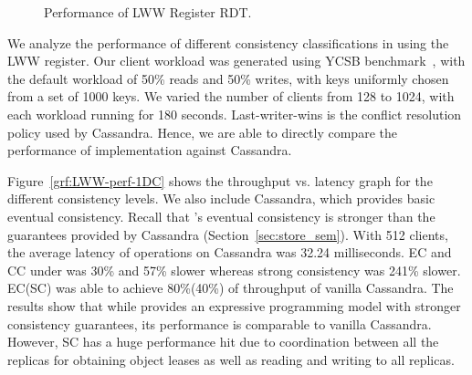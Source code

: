 \begin{figure}
  \centering
	\caption{Performance of LWW Register RDT.}
  \label{grf:LWW_perf}
\end{figure}

We analyze the performance of different consistency classifications in \name
using the LWW register. Our client workload was generated using YCSB
benchmark~\cite{}, with the default workload of 50\% reads and 50\% writes,
with keys uniformly chosen from a set of 1000 keys. We varied the number of
clients from 128 to 1024, with each workload running for 180 seconds.
Last-writer-wins is the conflict resolution policy used by Cassandra. Hence, we
are able to directly compare the performance of \name implementation against
Cassandra.

Figure~\ref{grf:LWW-perf-1DC} shows the throughput vs. latency graph for the
different consistency levels. We also include Cassandra, which provides basic
eventual consistency. Recall that \name's eventual consistency is stronger than
the guarantees provided by Cassandra (Section~\ref{sec:store_sem}). With 512
clients, the average latency of operations on Cassandra was 32.24 milliseconds.
EC and CC under \name was 30\% and 57\% slower whereas strong consistency was
241\% slower. EC(SC) was able to achieve 80\%(40\%) of throughput of vanilla
Cassandra. The results show that while \name provides an expressive programming
model with stronger consistency guarantees, its performance is comparable to
vanilla Cassandra. However, SC has a huge performance hit due to coordination
between all the replicas for obtaining object leases as well as reading and
writing to all replicas.

